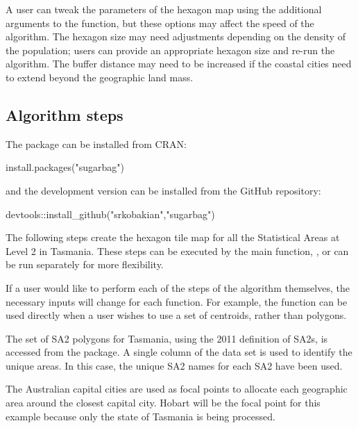 A user can tweak the parameters of the hexagon map using the additional
arguments to the  function, but these options may
affect the speed of the algorithm. The hexagon size may need adjustments
depending on the density of the population; users can provide an
appropriate hexagon size and re-run the algorithm. The buffer distance
may need to be increased if the coastal cities need to extend beyond the
geographic land mass.

\hypertarget{algorithm-steps}{%
\subsection{Algorithm steps}\label{algorithm-steps}}

The package can be installed from CRAN:

\begin{Schunk}
\begin{Sinput}
install.packages("sugarbag")
\end{Sinput}
\end{Schunk}

\noindent and the development version can be installed from the GitHub
repository:

\begin{Schunk}
\begin{Sinput}
devtools::install_github("srkobakian","sugarbag")
\end{Sinput}
\end{Schunk}

The following steps create the hexagon tile map for all the Statistical
Areas at Level 2 in Tasmania. These steps can be executed by the main
function, , or can be run separately for more
flexibility.

If a user would like to perform each of the steps of the algorithm
themselves, the necessary inputs will change for each function. For
example, the  function can be used directly when a user
wishes to use a set of centroids, rather than polygons.

The set of SA2 polygons for Tasmania, using the 2011 definition of SA2s,
is accessed from the  package. A single column of the
data set is used to identify the unique areas. In this case, the unique
SA2 names for each SA2 have been used.

The Australian capital cities are used as focal points to allocate each
geographic area around the closest capital city. Hobart will be the
focal point for this example because only the state of Tasmania is being
processed.

